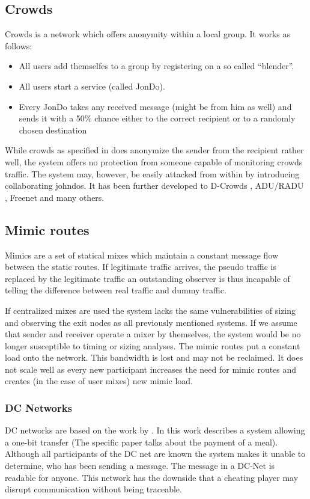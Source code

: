\subsection{Crowds}

Crowds is a network which offers anonymity within a local group. It works as follows:

\begin{itemize}
	\item All users add themselfes to a group by registering on a so called ``blender''.
	\item All users start a service (called JonDo).
	\item Every JonDo takes any received message (might be from him as well) and sends it with a 50\% chance either to the correct recipient or to a randomly chosen destination
\end{itemize}

While crowds as specified in \cite{crowds:tissec} does anonymize the sender from the recipient rather well, the system offers no protection from someone capable of monitoring crowds traffic. The system may, however, be easily attacked from within by introducing collaborating johndos. It has been further developed to D-Crowds \cite{DBLP:conf/esorics/DanezisDKT09}, ADU/RADU \cite{Munoz-Gea2008}, Freenet\cite{freenet} and many others. 

\subsection{Mimic routes}
Mimics are a set of statical mixes which maintain a constant message flow between the static routes. If legitimate traffic arrives, the pseudo traffic is replaced by the legitimate traffic an outstanding observer is thus incapable of telling the difference between real traffic and dummy traffic.

If centralized mixes are used the system lacks the same vulnerabilities of sizing and observing the exit nodes as all previously mentioned systems. If we assume that sender and receiver operate a mixer by themselves, the system would be no longer susceptible to timing or sizing analyses. The mimic routes put a constant load onto the network. This bandwidth is lost and may not be reclaimed. It does not scale well as every new participant increases the need for mimic routes and creates (in the case of user mixes) new mimic load.

\subsubsection{DC Networks}
DC networks are based on the work  by \citeauthor{chaum-dc}\cite{chaum-dc}. In this work \citeauthor{chaum-dc} describes a system allowing a one-bit transfer (The specific paper talks about the payment of a meal). Although all participants of the DC net are known the system makes it unable to determine, who has been sending a message. The message in a DC-Net is readable for anyone. This network has the downside that a cheating player may disrupt communication without being traceable.

